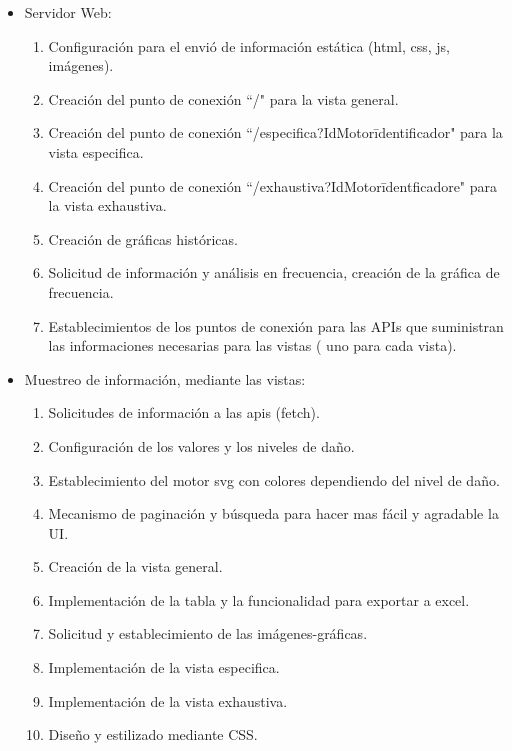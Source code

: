 \begin{itemize}
    \item Servidor Web:
        \begin{enumerate}
            \item Configuración para el envió de información estática
                (html, css, js, imágenes).
            \item Creación del punto de conexión ``/" para la vista general.
            \item Creación del punto de conexión ``/especifica?IdMotor\= identificador"
                para la vista especifica.
            \item Creación del punto de conexión ``/exhaustiva?IdMotor\=identficadore"
                para la vista exhaustiva.
            \item Creación de gráficas históricas.
            \item Solicitud de información y análisis en frecuencia, creación de
                la gráfica de frecuencia.
            \item Establecimientos de los puntos de conexión para las APIs que
                suministran las informaciones necesarias para las vistas (
                uno para cada vista).
        \end{enumerate}

    \item Muestreo de información, mediante las vistas:
        \begin{enumerate}
            \item Solicitudes de información a las apis (fetch).
            \item Configuración de los valores y los niveles de daño.
            \item Establecimiento del motor svg con colores dependiendo del nivel
                de daño.
            \item Mecanismo de paginación y búsqueda para hacer mas fácil y agradable
                la UI.
            \item Creación de la vista general.
            \item Implementación de la tabla y la funcionalidad para exportar a
                excel.
            \item Solicitud y establecimiento de las imágenes-gráficas.
            \item Implementación de la vista especifica.
            \item Implementación de la vista exhaustiva.
            \item Diseño y estilizado mediante CSS.
        \end{enumerate}


\end{itemize}
